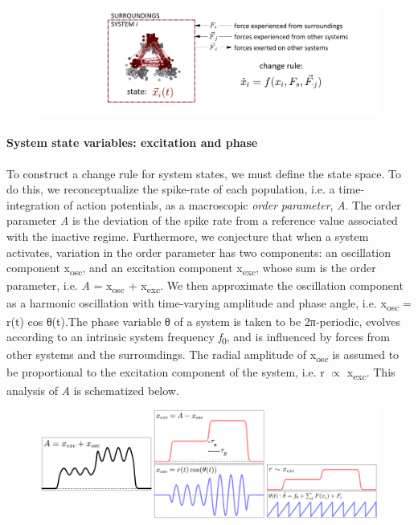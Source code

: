   
\begin{figure}
\includegraphics[width=\textwidth]{figures/Tilsen-img11.png}
\caption{\missingcaption}
\label{fig:}
\end{figure}
 

\paragraph{System state variables: excitation and phase}

To construct a change rule for system states, we must define the state space. To do this, we reconceptualize the spike-rate of each population, i.e. a time-integration of action potentials, as a macroscopic \textit{order} \textit{parameter}, \textit{A}. The order parameter \textit{A} is the deviation of the spike rate from a reference value associated with the inactive regime. Furthermore, we conjecture that when a system activates, variation in the order parameter has two components: an oscillation component x\textsubscript{osc}, and an excitation component x\textsubscript{exc}, whose sum is the order parameter, i.e. \textit{A} = x\textsubscript{osc} + x\textsubscript{exc}. We then approximate the oscillation component as a harmonic oscillation with time-varying amplitude and phase angle, i.e. x\textsubscript{osc} = r(t) cos θ(t).The phase variable θ of a system is taken to be 2π{}-periodic, evolves according to an intrinsic system frequency \textit{f}\textsubscript{0}, and is influenced by forces from other systems and the surroundings. The radial amplitude of x\textsubscript{osc} is assumed to be proportional to the excitation component of the system, i.e. r  ${\propto}$ x\textsubscript{exc}. This analysis of \textit{A} is schematized below.  

  
\begin{figure}
\includegraphics[width=\textwidth]{figures/Tilsen-img12.png}
\caption{\missingcaption}
\label{fig:}
\end{figure}
 

